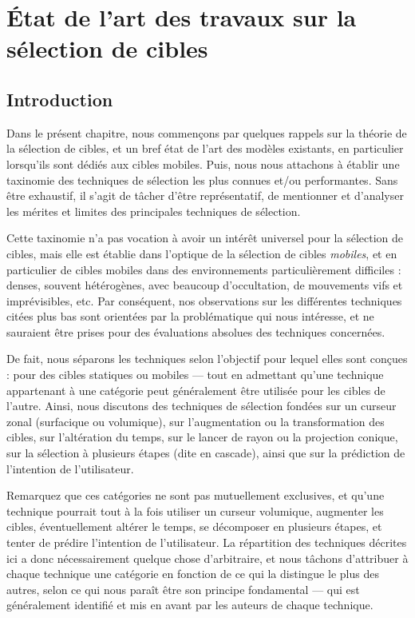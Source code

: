 
\chapter[Sélection de cibles : état de l'art]{État de l'art des travaux sur la sélection de cibles}
\minitoc
\label{chap2}
\cleardoublepage

\section{Introduction}
	Dans le présent chapitre, nous commençons par quelques rappels sur la théorie de la sélection de cibles, et un bref état de l'art des modèles existants, en particulier lorsqu'ils sont dédiés aux cibles mobiles. Puis, nous nous attachons à établir une taxinomie des techniques de sélection les plus connues et/ou performantes. Sans être exhaustif, il s'agit de tâcher d'être représentatif, de mentionner et d'analyser les mérites et limites des principales techniques de sélection.
	
	Cette taxinomie n'a pas vocation à avoir un intérêt universel pour la sélection de cibles, mais elle est établie dans l'optique de la sélection de cibles \emph{mobiles}, et en particulier de cibles mobiles dans des environnements particulièrement difficiles : denses, souvent hétérogènes, avec beaucoup d'occultation, de mouvements vifs et imprévisibles, etc. Par conséquent, nos observations sur les différentes techniques citées plus bas sont orientées par la problématique qui nous intéresse, et ne sauraient être prises pour des évaluations absolues des techniques concernées.
	
	De fait, nous séparons les techniques selon l'objectif pour lequel elles sont conçues : pour des cibles statiques ou mobiles --- tout en admettant qu'une technique appartenant à une catégorie peut généralement être utilisée pour les cibles de l'autre. Ainsi, nous discutons des techniques de sélection fondées sur un curseur zonal (surfacique ou volumique), sur l'augmentation ou la transformation des cibles, sur l'altération du temps, sur le lancer de rayon ou la projection conique, sur la sélection à plusieurs étapes (dite en cascade), ainsi que sur la prédiction de l'intention de l'utilisateur.
	
	Remarquez que ces catégories ne sont pas mutuellement exclusives, et qu'une technique pourrait tout à la fois utiliser un curseur volumique, augmenter les cibles, éventuellement altérer le temps, se décomposer en plusieurs étapes, et tenter de prédire l'intention de l'utilisateur. La répartition des techniques décrites ici a donc nécessairement quelque chose d'arbitraire, et nous tâchons d'attribuer à chaque technique une catégorie en fonction de ce qui la distingue le plus des autres, selon ce qui nous paraît être son principe fondamental --- qui est généralement identifié et mis en avant par les auteurs de chaque technique.
	
